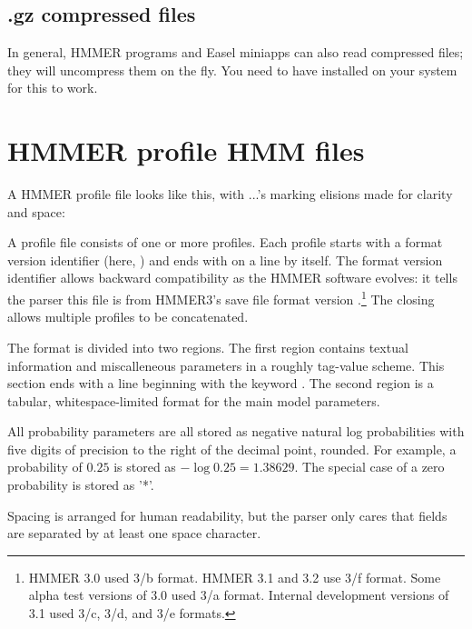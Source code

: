 \subsection{.gz compressed files}

In general, HMMER programs and Easel miniapps can also read 
compressed files; they will uncompress them on the fly. You need to
have  installed on your system for this to work.




\newpage
\section{HMMER profile HMM files}
\label{section:savefiles}

A HMMER profile file looks like this, with ...'s marking elisions made
for clarity and space:


A profile file consists of one or more profiles.  Each profile starts
with a format version identifier (here, ) and ends with
\mono{//} on a line by itself.  The format version identifier allows
backward compatibility as the HMMER software evolves: it tells the
parser this file is from HMMER3's save file format version
\HMMERfmtversion{}.\footnote{HMMER 3.0 used 3/b format. HMMER 3.1 and 3.2 use 3/f
  format.  Some alpha test versions of 3.0 used 3/a format. Internal
  development versions of 3.1 used 3/c, 3/d, and 3/e formats.}  The
closing \mono{//} allows multiple profiles to be concatenated.

The format is divided into two regions. The first region contains
textual information and miscalleneous parameters in a roughly
tag-value scheme.  This section ends with a line beginning with the
keyword . The second region is a tabular, whitespace-limited
format for the main model parameters.

All probability parameters are all stored as negative natural log
probabilities with five digits of precision to the right of the
decimal point, rounded. For example, a probability of $0.25$ is stored
as $-\log 0.25 = 1.38629$. The special case of a zero probability is
stored as '*'.

Spacing is arranged for human readability, but the parser only cares
that fields are separated by at least one space character.

